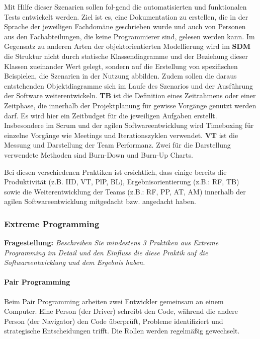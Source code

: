 Mit Hilfe dieser Szenarien sollen fol-gend die automatisierten und funktionalen Tests entwickelt werden. Ziel ist es, eine Dokumentation zu erstellen, 
die in der Sprache der jeweiligen Fachdomäne geschrieben wurde und auch von Personen aus den Fachabteilungen, die keine Programmierer sind, gelesen werden kann.\cite{Blasquez2017-og,Bache2014-cp}
\newline
Im Gegensatz zu anderen Arten der objektorientierten Modellierung wird im \textbf{SDM} die Struktur nicht durch statische Klassendiagramme und der Beziehung dieser Klassen zueinander Wert gelegt, sondern auf die Erstellung von spezifischen Beispielen, die Szenarien in der Nutzung abbilden. 
Zudem sollen die daraus entstehenden Objektdiagramme sich im Laufe des Szenarios und der Ausführung der Software weiterentwickeln.\cite{Wautelet2017-rv}
\newline
\textbf{TB} ist die Definition eines Zeitrahmens oder einer Zeitphase, die innerhalb der Projektplanung für gewisse Vorgänge genutzt werden darf. Es wird hier ein Zeitbudget für die jeweiligen Aufgaben erstellt. 
Insbesondere im Scrum und der agilen Softwareentwicklung wird Timeboxing für einzelne Vorgänge wie Meetings und Iterationszyklen verwendet. \cite{Miranda2011-yh}
\newline
\textbf{VT} ist die Messung und Darstellung der Team Performanz. Zwei für die Darstellung verwendete Methoden sind Burn-Down und Burn-Up Charts.\cite{Al-Sabbagh2018-bd}
\newline

Bei diesen verschiedenen Praktiken ist ersichtlich, dass einige bereits die Produktivität (z.B. IID, VT, PlP, BL), Ergebnisorientierung (z.B.: RF, TB) sowie die Weiterentwicklung der Teams (z.B.: RF, PP, AT, AM) innerhalb der agilen Softwareentwicklung mitgedacht bzw. angedacht haben.
\subsubsection{Extreme Programming}

\textbf{Fragestellung:} \textit{Beschreiben Sie mindestens 3 Praktiken aus Extreme Programming im Detail und den Einfluss
die diese Praktik auf die Softwareentwicklung und dem Ergebnis haben.}

\paragraph{Pair Programming}
Beim Pair Programming arbeiten zwei Entwickler gemeinsam an einem Computer. Eine Person (der Driver) schreibt den Code, 
während die andere Person (der Navigator) den Code überprüft, Probleme identifiziert und strategische Entscheidungen trifft. 
Die Rollen werden regelmäßig gewechselt.

